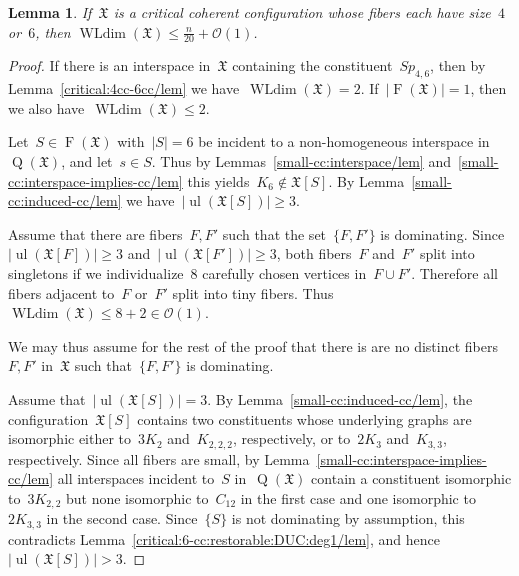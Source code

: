 \documentclass[english,a4paper]{article}
\theoremstyle{plain}
\newtheorem{lemma}      [theorem]{Lemma}
\theoremstyle{definition}
\newcommand{\abs}[1]{| #1 |}
\DeclareMathOperator{\Fibers}{F}
\newcommand{\coherentConfig}{\ensuremath{\mathfrak{X}}}
\newcommand{\fibers}[1]{\ensuremath{\Fibers \left( #1 \right)}}
\newcommand{\inducedCC}[1]{\ensuremath{\coherentConfig[#1]}}
\DeclareMathOperator*{\ul}{ul}
\DeclareMathOperator*{\WLdim}{WLdim}
\newcommand{\wldim}[1]{\ensuremath{\WLdim\left(#1\right)}}
\DeclareMathOperator*{\Quotient}{Q}
\newcommand{\quotientGraph}[1]{\ensuremath{\Quotient(#1)}}
\newcommand{\clique}[1]{\ensuremath{K_{#1}}}
\newcommand{\cycle}[1]{\ensuremath{C_{#1}}}
\newcommand{\disjointCliques}[2]{\ensuremath{#1 \clique{#2}}}
\newcommand{\interspaceFourSix}{\ensuremath{Sp_{4,6}}}
\begin{document}
\begin{lemma}
\label{6-cc:wldim/lem}
    If~$\coherentConfig$ is a critical coherent configuration whose fibers each have size~$4$ or~$6$, then $\wldim{\coherentConfig} \leq \frac{n}{20}+ \mathcal{O}(1)$.
\end{lemma}
\begin{proof}
    If there is an interspace in~$\coherentConfig$ containing the constituent~$\interspaceFourSix$, then by Lemma~\ref{critical:4cc-6cc/lem} we have~$\wldim{\coherentConfig} = 2$.
    If~$|\fibers{\coherentConfig}| = 1$, then we also have~$\wldim{\coherentConfig} \leq 2$.

    Let~$S \in \fibers{\coherentConfig}$ with~$\abs{S} = 6$ be incident to a non-homogeneous interspace in~$\quotientGraph{\coherentConfig}$, and let~$s \in S$.
    Thus by Lemmas~\ref{small-cc:interspace/lem} and~\ref{small-cc:interspace-implies-cc/lem} this yields~$\clique{6} \notin \inducedCC{S}$.
    By Lemma~\ref{small-cc:induced-cc/lem} we have~$\abs{\ul(\inducedCC{S})} \geq 3$.

    Assume that there are fibers~$F,F'$ such that the set~$\{F,F'\}$ is dominating.
    Since~$\abs{\ul(\inducedCC{F})} \geq 3$ and~$\abs{\ul(\inducedCC{F'})} \geq 3$, both fibers~$F$ and~$F'$ split into singletons if we individualize~$8$ carefully chosen vertices in~$F \cup F'$.
    Therefore all fibers adjacent to~$F$ or~$F'$ split into tiny fibers.
    Thus~$\wldim{\coherentConfig} \leq 8 + 2 \in \mathcal{O}(1)$.

    We may thus assume for the rest of the proof that there is are no distinct fibers~$F,F'$ in~$\coherentConfig$ such that~$\{F,F'\}$ is dominating.

    Assume that~$\abs{\ul(\inducedCC{S})} = 3$.
    By Lemma~\ref{small-cc:induced-cc/lem}, the configuration~$\inducedCC{S}$ contains two constituents whose underlying graphs are isomorphic either to~$\disjointCliques{3}{2}$ and~$\clique{2,2,2}$, respectively, or to~$\disjointCliques{2}{3}$ and~$\clique{3,3}$, respectively.
    Since all fibers are small, by Lemma~\ref{small-cc:interspace-implies-cc/lem} all interspaces incident to~$S$ in~$\quotientGraph{\coherentConfig}$ contain a constituent isomorphic to~$\disjointCliques{3}{2,2}$ but none isomorphic to~$\cycle{12}$ in the first case and one isomorphic to~$\disjointCliques{2}{3,3}$ in the second case.
    Since~$\{S\}$ is not dominating by assumption, this contradicts Lemma~\ref{critical:6-cc:restorable:DUC:deg1/lem}, and hence~$\abs{\ul(\inducedCC{S})} > 3$.


\end{proof}
\end{document}
